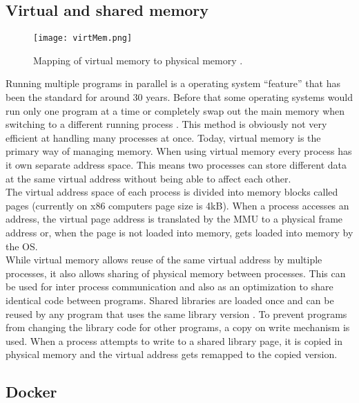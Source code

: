 \documentclass[conference,compsoc,final,a4paper]{IEEEtran}
\begin{document}
\subsection{Virtual and shared memory}
\begin{figure}[!ht]
\centering
\texttt{[image: virtMem.png]}
\caption{Mapping of virtual memory to physical memory \cite{tanenbaum1997operating}.}
\label{virtmem}
\end{figure}
Running multiple programs in parallel is a operating system \enquote{feature} that has been the standard for around 30 years. Before that some operating systems would run only one program at a time or completely swap out the main memory when switching to a different running process \cite{tanenbaum1997operating}. This method is obviously not very efficient at handling many processes at once. Today, virtual memory is the primary way of managing memory. When using virtual memory every process has it own separate address space. This means two processes can store different data at the same virtual address without being able to affect each other. \cite[p.~620]{hennessy2011computer}\\
The virtual address space of each process is divided into memory blocks called pages (currently on x86 computers page size is 4kB). When a process accesses an address, the virtual page address is translated by the \ac{MMU} to a physical frame address or, when the page is not loaded into memory, gets loaded into memory by the OS. \\
While virtual memory allows reuse of the same virtual address by multiple processes, it also allows sharing of physical memory between processes. This can be used for inter process communication and also as an optimization to share identical code between programs. Shared libraries are loaded once and can be reused by any program that uses the same library version \cite{tanenbaum1997operating}. To prevent programs from changing the library code for other programs, a copy on write mechanism is used. When a process attempts to write to a shared library page, it is copied in physical memory and the virtual address gets remapped to the copied version. \cite[p.~295]{bovet2005understanding}
\subsection{Docker}
\end{document}
